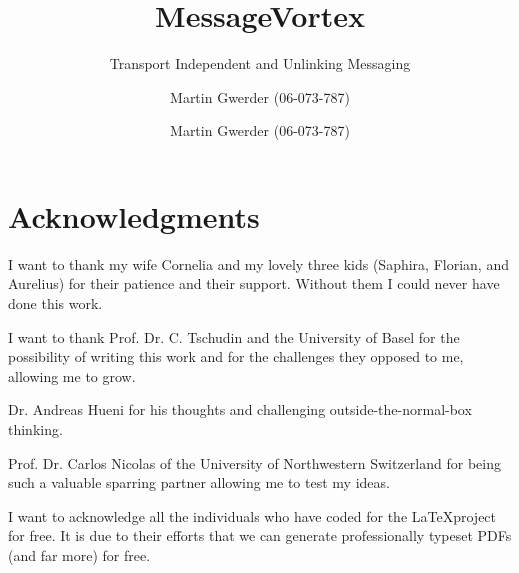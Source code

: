 \documentclass[a4paper,appendixprefix,pdfusetitle,twocolumn,fontsize=8pt,DIV=calc,8pt,draft]{\doctype} %
\title{\thetitle}
\subtitle{\thesubtitle}
\author{Martin Gwerder (06-073-787)}
\title{MessageVortex}
\subtitle{Transport Independent and Unlinking Messaging}
\author{Martin Gwerder (06-073-787)}
\date{\gitAuthorDate}
\begin{document}
%
%
\frontmatter%
%

%

\vspace*{\fill}

\section*{Acknowledgments}
I want to thank my wife Cornelia and my lovely three kids (Saphira, Florian, and Aurelius) for their patience and their support. Without them I could never have done this work.

I want to thank Prof. Dr. C. Tschudin and the University of Basel for the possibility of writing this work and for the challenges they opposed to me, allowing me to grow. 

Dr. Andreas Hueni for his thoughts and challenging outside-the-normal-box thinking.

Prof. Dr. Carlos Nicolas of the University of Northwestern Switzerland for being such a valuable sparring partner allowing me to test my ideas.

I want to acknowledge all the individuals who have coded for the \LaTeX project for free. It is due to their efforts that we can generate professionally typeset PDFs (and far more) for free.

\cleardoublepage
\makeatletter
\renewcommand{\@pnumwidth}{4em}
\renewcommand*\l@section{\@dottedtocline{1}{1.5em}{3em}}
\renewcommand*\l@subsection{\@dottedtocline{2}{3.8em}{3.8em}}
\renewcommand*\l@subsubsection{\@dottedtocline{3}{7.4em}{5em}}
\renewcommand*\l@part[2]{%
	\ifnum \c@tocdepth >-2\relax
	\addpenalty{-\@highpenalty}%
	\addvspace{2.25em \@plus\p@}%
	\setlength\@tempdima{3em}%
	\begingroup
	\parindent \z@ \rightskip \@pnumwidth
	\parfillskip -\@pnumwidth
	\begin{tcolorbox}[colback=red!10, right=0ex, left=0cm, sharpish corners, boxrule=0mm, width=1.0\textwidth]
		{\leavevmode
			\large \bfseries \vbox{\sffamily\bfseries#1}%
			\hb@xt@0ex{\hss #2}
		}
	\end{tcolorbox}
	\vspace*{1ex}
	\nobreak
	\global\@nobreaktrue
	\everypar{\global\@nobreakfalse\everypar{}}%
	\endgroup
	\fi}
\makeatother

\onecolumn
\setcounter{tocdepth}{2}
\tableofcontents
\indexes

\makeatletter
\newlength\mylena
\newlength\mylenb
\setlength\mylena{1.3cm}
\setlength\mylenb{\dimexpr\columnwidth-\mylena\relax}
\end{document}
